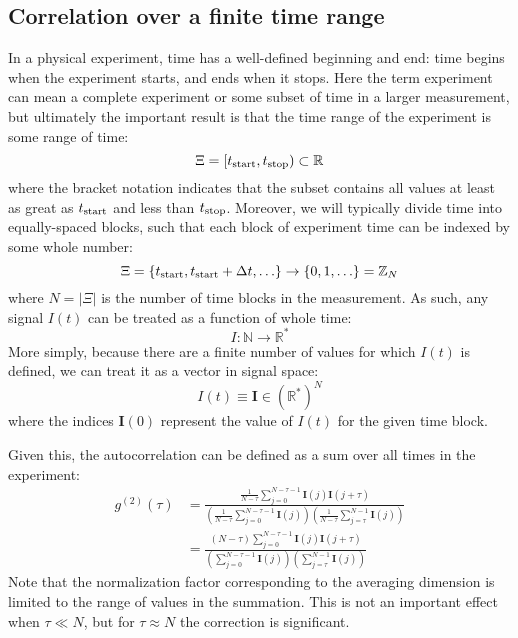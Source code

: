 \documentclass{article}
\newcommand{\braces}[1]{\ensuremath{\left\lbrace #1 \right\rbrace}}
\newcommand{\parens}[1]{\ensuremath{\left( #1 \right)}}
\newcommand{\gn}[1]{\ensuremath{g^{(#1)}}}
\newcommand{\integers}{\ensuremath{\mathbb{Z}}}
\newcommand{\wholes}{\ensuremath{\mathbb{N}}}
\newcommand{\reals}{\ensuremath{\mathbb{R}}}
\renewcommand{\vec}{\boldsymbol}
\newcommand{\abs}[1]{\ensuremath{\left|#1\right|}}
\newcommand{\integrationtime}{\ensuremath{\Xi}}
\newcommand{\tstart}{\ensuremath{t_{\textnormal{start}}}}
\newcommand{\tstop}{\ensuremath{t_{\textnormal{stop}}}}
\begin{document}
\subsection{Correlation over a finite time range}
In a physical experiment, time has a well-defined beginning and end: time begins when the experiment starts, and ends when it stops. Here the term experiment can mean a complete experiment or some subset of time in a larger measurement, but ultimately the important result is that the time range of the experiment is some range of time:
\begin{equation}
\integrationtime = [\tstart,\tstop)\subset\reals
\end{equation}
where the bracket notation indicates that the subset contains all values at least as great as $t_{\textnormal{start}}$ and less than $t_{\textnormal{stop}}$. Moreover, we will typically divide time into equally-spaced blocks, such that each block of experiment time can be indexed by some whole number:
\begin{equation}
\integrationtime = \braces{\tstart,\tstart+\Delta t,\ldots} 
       \rightarrow \braces{0,1,\ldots} = \integers_{N}
\end{equation}
where $N=\abs{\integrationtime}$ is the number of time blocks in the measurement. As such, any signal $I(t)$ can be treated as a function of whole time:
\begin{equation}
I:\wholes\rightarrow\reals^{*}
\end{equation}
More simply, because there are a finite number of values for which $I(t)$ is defined, we can treat it as a vector in signal space:
\begin{equation}
I(t) \equiv \vec{I}\in \left(\reals^{*}\right)^{N}
\end{equation}
where the indices $\vec{I}(0)$ represent the value of $I(t)$ for the given time block. 

Given this, the autocorrelation can be defined as a sum over all times in the experiment:
\begin{align}
\gn{2}(\tau) &= \frac{\frac{1}{N-\tau}\sum_{j=0}^{N-\tau-1}{\vec{I}(j)\vec{I}(j+\tau)}}
                     {\parens{\frac{1}{N-\tau}\sum_{j=0}^{N-\tau-1}{\vec{I}(j)}}
                      \parens{\frac{1}{N-\tau}\sum_{j=\tau}^{N-1}{\vec{I}(j)}}} \nonumber \\
\label{eq:discrete_g2} &= \frac{\parens{N-\tau}\sum_{j=0}^{N-\tau-1}{\vec{I}(j)\vec{I}(j+\tau)}}
                    {\parens{\sum_{j=0}^{N-\tau-1}{\vec{I}(j)}}
                     \parens{\sum_{j=\tau}^{N-1}{\vec{I}(j)}}}
\end{align}
Note that the normalization factor corresponding to the averaging dimension is limited to the range of values in the summation. This is not an important effect when $\tau\ll N$, but for $\tau\approx N$ the correction is significant.
\end{document}
